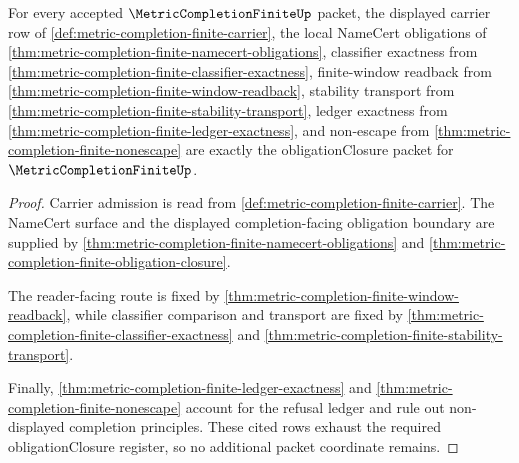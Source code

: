 \begin{theorem}
\label{thm:metric-completion-finite-obligation-closure-register}
For every accepted $\MetricCompletionFiniteUp$ packet, the displayed carrier row of \autoref{def:metric-completion-finite-carrier}, the local NameCert obligations of \autoref{thm:metric-completion-finite-namecert-obligations}, classifier exactness from \autoref{thm:metric-completion-finite-classifier-exactness}, finite-window readback from \autoref{thm:metric-completion-finite-window-readback}, stability transport from \autoref{thm:metric-completion-finite-stability-transport}, ledger exactness from \autoref{thm:metric-completion-finite-ledger-exactness}, and non-escape from \autoref{thm:metric-completion-finite-nonescape} are exactly the obligationClosure packet for $\MetricCompletionFiniteUp$.
\end{theorem}
\begin{proof}
Carrier admission is read from \autoref{def:metric-completion-finite-carrier}. The NameCert surface and the displayed completion-facing obligation boundary are supplied by \autoref{thm:metric-completion-finite-namecert-obligations} and \autoref{thm:metric-completion-finite-obligation-closure}.

The reader-facing route is fixed by \autoref{thm:metric-completion-finite-window-readback}, while classifier comparison and transport are fixed by \autoref{thm:metric-completion-finite-classifier-exactness} and \autoref{thm:metric-completion-finite-stability-transport}.

Finally, \autoref{thm:metric-completion-finite-ledger-exactness} and \autoref{thm:metric-completion-finite-nonescape} account for the refusal ledger and rule out non-displayed completion principles. These cited rows exhaust the required obligationClosure register, so no additional packet coordinate remains.
\end{proof}

